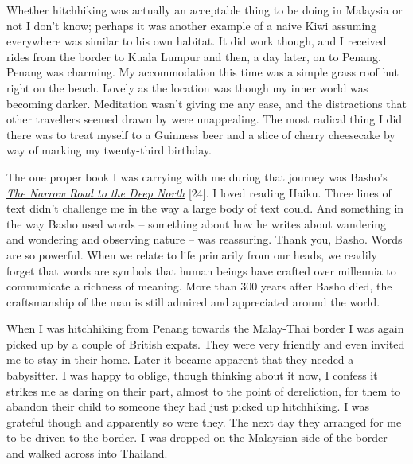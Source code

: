 Whether hitchhiking was actually an acceptable thing to be doing in
Malaysia or not I don't know; perhaps it was another example of a naive
Kiwi assuming everywhere was similar to his own habitat. It did work
though, and I received rides from the border to Kuala Lumpur and then, a
day later, on to Penang. Penang was charming. My accommodation this time
was a simple grass roof hut right on the beach. Lovely as the location
was though my inner world was becoming darker. Meditation wasn't giving
me any ease, and the distractions that other travellers seemed drawn by
were unappealing. The most radical thing I did there was to treat myself
to a Guinness beer and a slice of cherry cheesecake by way of marking my
twenty-third birthday.

The one proper book I was carrying with me during that journey was
Basho's
\emph{\underline{\href{https://www.goodreads.com/book/show/175626.The_Narrow_Road_to_the_Deep_North_and_Other_Travel_Sketches}{The
Narrow Road to the Deep Nort}h}} {[}24{]}. I loved reading Haiku. Three
lines of text didn't challenge me in the way a large body of text could.
And something in the way Basho used words -- something about how he
writes about wandering and wondering and observing nature -- was
reassuring. Thank you, Basho. Words are so powerful. When we relate to
life primarily from our heads, we readily forget that words are symbols
that human beings have crafted over millennia to communicate a richness
of meaning. More than 300 years after Basho died, the craftsmanship of
the man is still admired and appreciated around the world.

When I was hitchhiking from Penang towards the Malay-Thai border I was
again picked up by a couple of British expats. They were very friendly
and even invited me to stay in their home. Later it became apparent that
they needed a babysitter. I was happy to oblige, though thinking about
it now, I confess it strikes me as daring on their part, almost to the
point of dereliction, for them to abandon their child to someone they
had just picked up hitchhiking. I was grateful though and apparently so
were they. The next day they arranged for me to be driven to the border.
I was dropped on the Malaysian side of the border and walked across into
Thailand.

